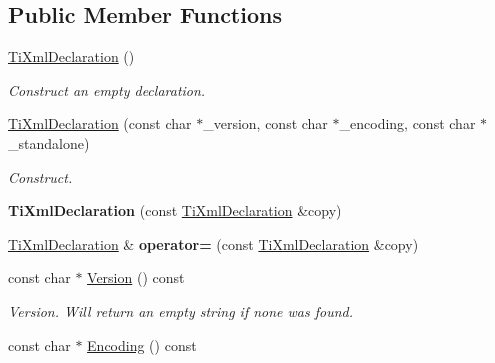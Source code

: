 \subsection*{\-Public \-Member \-Functions}
\begin{DoxyCompactItemize}
\item 
\hypertarget{class_ti_xml_declaration_aa0484d059bea0ea1acb47c9094382d79}{\hyperlink{class_ti_xml_declaration_aa0484d059bea0ea1acb47c9094382d79}{\-Ti\-Xml\-Declaration} ()}\label{class_ti_xml_declaration_aa0484d059bea0ea1acb47c9094382d79}

\begin{DoxyCompactList}\small\item\em \-Construct an empty declaration. \end{DoxyCompactList}\item 
\hypertarget{class_ti_xml_declaration_a3b618d1c30c25e4b7a71f31a595ee298}{\hyperlink{class_ti_xml_declaration_a3b618d1c30c25e4b7a71f31a595ee298}{\-Ti\-Xml\-Declaration} (const char $\ast$\-\_\-version, const char $\ast$\-\_\-encoding, const char $\ast$\-\_\-standalone)}\label{class_ti_xml_declaration_a3b618d1c30c25e4b7a71f31a595ee298}

\begin{DoxyCompactList}\small\item\em \-Construct. \end{DoxyCompactList}\item 
\hypertarget{class_ti_xml_declaration_a58ac9042c342f7845c8491da0bb091e8}{{\bfseries \-Ti\-Xml\-Declaration} (const \hyperlink{class_ti_xml_declaration}{\-Ti\-Xml\-Declaration} \&copy)}\label{class_ti_xml_declaration_a58ac9042c342f7845c8491da0bb091e8}

\item 
\hypertarget{class_ti_xml_declaration_a3bc617efe11014ff2b1a9c5727c37a9a}{\hyperlink{class_ti_xml_declaration}{\-Ti\-Xml\-Declaration} \& {\bfseries operator=} (const \hyperlink{class_ti_xml_declaration}{\-Ti\-Xml\-Declaration} \&copy)}\label{class_ti_xml_declaration_a3bc617efe11014ff2b1a9c5727c37a9a}

\item 
\hypertarget{class_ti_xml_declaration_a02ee557b1a4545c3219ed377c103ec76}{const char $\ast$ \hyperlink{class_ti_xml_declaration_a02ee557b1a4545c3219ed377c103ec76}{\-Version} () const }\label{class_ti_xml_declaration_a02ee557b1a4545c3219ed377c103ec76}

\begin{DoxyCompactList}\small\item\em \-Version. \-Will return an empty string if none was found. \end{DoxyCompactList}\item 
\hypertarget{class_ti_xml_declaration_a5d974231f9e9a2f0542f15f3a46cdb76}{const char $\ast$ \hyperlink{class_ti_xml_declaration_a5d974231f9e9a2f0542f15f3a46cdb76}{\-Encoding} () const }\label{class_ti_xml_declaration_a5d974231f9e9a2f0542f15f3a46cdb76}


\end{DoxyCompactItemize}

